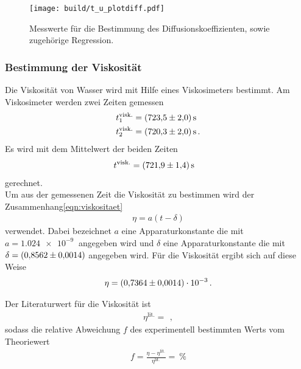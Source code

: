 \begin{figure}[hhh]
  \centering
  \texttt{[image: build/t\_u\_plotdiff.pdf]}
  \caption{Messwerte für die Bestimmung des Diffusionskoeffizienten, sowie zugehörige Regression.}
  \label{fig:diffusion}
\end{figure}

\FloatBarrier
\subsubsection{Bestimmung der Viskosität}
\label{subsubsec:viskositaet}
Die Viskosität von Wasser wird mit Hilfe eines Viskosimeters bestimmt.
Am Viskosimeter werden zwei Zeiten gemessen
\begin{align*}
  t_{1}^\text{visk.} &= \SI{723.5+-2}{\second}\\
  t_{2}^\text{visk.} &= \SI{720.3+-2}{\second}\, .
\end{align*}
Es wird mit dem Mittelwert der beiden Zeiten
\begin{align*}
  t^\text{visk.} &= \SI{721.9+-1.4}{\second}
\end{align*}
gerechnet.\\
Um aus der gemessenen Zeit die Viskosität zu bestimmen wird der Zusammenhang\eqref{eqn:viskositaet}
\begin{align}
  \eta = a \left(t - \delta \right)
\end{align}
verwendet. Dabei bezeichnet $a$ eine Apparaturkonstante die mit $a = \SI{1.024e-9}{}$ angegeben wird und $\delta$
eine Apparaturkonstante die mit $\delta = \SI{0.8562+-0.0014}{}$ angegeben wird.
Für die Viskosität ergibt sich auf diese Weise
\begin{align*}
  \eta = \SI{0.7364+-0.0014 e-3}{} \, .
\end{align*}

Der Literaturwert\cite{lig_v} für die Viskosität ist
\begin{align*}
  \eta^\text{lit.} = \SI{}{} \, ,
\end{align*}
sodass die relative Abweichung $f$ des experimentell bestimmten Werts
vom Theoriewert
\begin{align*}
  f = \frac{\eta - \eta^\text{lit.}}{\eta^\text{lit.}} = \SI{}{\percent}
\end{align*}


\FloatBarrier
